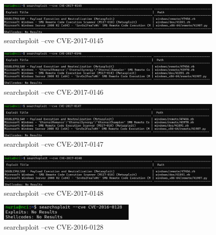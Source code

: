 \documentclass[a4paper,12pt]{article} %
\begin{document}
            \begin{figure} [hp!]
             \centering
             \includegraphics[width=1\textwidth]{imagenes/cve201745.png}
             \caption{ searchsploit --cve CVE-2017-0145}
             \label{fig:45}
            \end{figure}

            \begin{figure} [hp!]
             \centering
             \includegraphics[width=1\textwidth]{imagenes/cve201746.png}
             \caption{ searchsploit --cve CVE-2017-0146}
             \label{fig:46}
            \end{figure}

\newpage
            \begin{figure} [hp!]
             \centering
             \includegraphics[width=1\textwidth]{imagenes/cve201747.png}
             \caption{ searchsploit --cve CVE-2017-0147}
             \label{fig:47}
            \end{figure}

            \begin{figure} [hp!]
             \centering
             \includegraphics[width=1\textwidth]{imagenes/cve201748.png}
             \caption{ searchsploit --cve CVE-2017-0148}
             \label{fig:48}
            \end{figure}

            \begin{figure} [hp!]
             \centering
             \includegraphics[width=0.6\textwidth]{imagenes/cve2016No.png}
             \caption{ searchsploit --cve CVE-2016-0128}
             \label{fig:16No}
            \end{figure}
\end{document}
